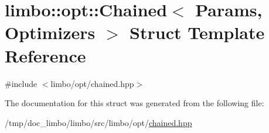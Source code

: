 \hypertarget{structlimbo_1_1opt_1_1_chained}{}\section{limbo\+:\+:opt\+:\+:Chained$<$ Params, Optimizers $>$ Struct Template Reference}
\label{structlimbo_1_1opt_1_1_chained}


{\ttfamily \#include $<$limbo/opt/chained.\+hpp$>$}



The documentation for this struct was generated from the following file\+:\begin{DoxyCompactItemize}
\item 
/tmp/doc\+\_\+limbo/limbo/src/limbo/opt/\hyperlink{chained_8hpp}{chained.\+hpp}\end{DoxyCompactItemize}
